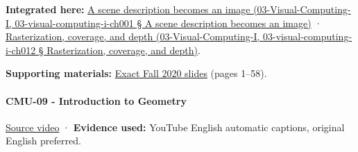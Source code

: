\textbf{Integrated here:} \href{}{A scene description becomes an image (03-Visual-Computing-I, 03-visual-computing-i-ch001 § A scene description becomes an image)} · \href{}{Rasterization, coverage, and depth (03-Visual-Computing-I, 03-visual-computing-i-ch012 § Rasterization, coverage, and depth)}.

\textbf{Supporting materials:} \href{https://15462.courses.cs.cmu.edu/fall2020content/lectures/08_depthtransparency/08_depthtransparency_slides.pdf}{Exact Fall 2020 slides} (pages 1--58).

\paragraph{CMU-09 - Introduction to Geometry}\label{cmu-09---introduction-to-geometry}

\href{https://www.youtube.com/watch?v=MakhXtIX2YM}{Source video} · \textbf{Evidence used:} YouTube English automatic captions, original English preferred.

